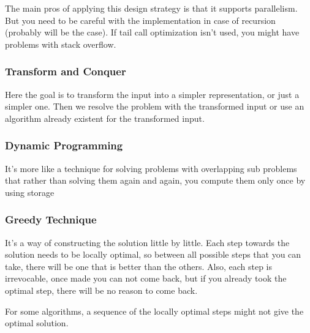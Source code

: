 \documentclass[a4paper,12pt]{article}
\theoremstyle{mytheoremstyle}
\theoremstyle{mytheoremstyle}
\theoremstyle{myproblemstyle}
\begin{document}
    The main pros of applying this design strategy is that it supports
    parallelism. But you need to be careful with the implementation in case of
    recursion (probably will be the case). If tail call optimization isn't
    used, you might have problems with stack overflow.

    \subsubsection{Transform and Conquer}

    Here the goal is to transform the input into a simpler representation, or
    just a simpler one. Then we resolve the problem with the transformed input
    or use an algorithm already existent for the transformed input.

    \subsubsection{Dynamic Programming}

    It's more like a technique for solving problems with overlapping
    sub problems that rather than solving them again and again, you compute
    them only once by using storage

    \subsubsection{Greedy Technique}

    It's a way of constructing the solution little by little. Each step towards
    the solution needs to be locally optimal, so between all possible steps
    that you can take, there will be one that is better than the others. Also,
    each step is irrevocable, once made you can not come back, but if you
    already took the optimal step, there will be no reason to come back.

    For some algorithms, a sequence of the locally optimal steps might not give
    the optimal solution.


\end{document}
